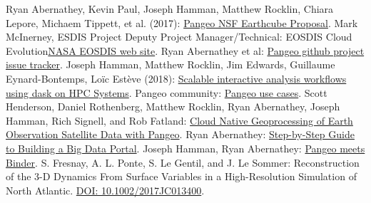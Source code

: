 \documentclass{article}
\begin{document}
\begin{thebibliography}{00}
 Ryan Abernathey, Kevin Paul, Joseph Hamman, Matthew Rocklin, Chiara Lepore, Michaem Tippett, et al. (2017): \href{https://figshare.com/articles/Pangeo_NSF_Earthcube_Proposal/5361094}{Pangeo NSF Earthcube Proposal}. 
 Mark McInerney, ESDIS Project Deputy Project Manager/Technical: EOSDIS Cloud Evolution\href{https://earthdata.nasa.gov/about/eosdis-cloud-evolution}{NASA EOSDIS web site}. 
 Ryan Abernathey et al: \href{https://github.com/pangeo-data/pangeo/issues}{Pangeo github project issue tracker}. 
 Joseph Hamman, Matthew Rocklin, Jim Edwards, Guillaume Eynard-Bontemps, Loïc Estève (2018): \href{https://medium.com/pangeo/dask-jobqueue-d7754e42ca53}{Scalable interactive analysis workflows using dask on HPC Systems}. 
 Pangeo community: \href{http://pangeo.io/use_cases/index.html}{Pangeo use cases}. 
 Scott Henderson, Daniel Rothenberg, Matthew Rocklin, Ryan Abernathey, Joseph Hamman, Rich Signell, and Rob Fatland: \href{https://medium.com/pangeo/cloud-native-geoprocessing-of-earth-observation-satellite-data-with-pangeo-997692d91ca2}{Cloud Native Geoprocessing of Earth Observation Satellite Data with Pangeo}. 
 Ryan Abernathey: \href{https://medium.com/pangeo/step-by-step-guide-to-building-a-big-data-portal-e262af1c2977}{Step-by-Step Guide to Building a Big Data Portal}.
 Joseph Hamman, Ryan Abernathey: \href{https://medium.com/pangeo/pangeo-meets-binder-2ea923feb34f}{Pangeo meets Binder}.
 S. Fresnay, A. L. Ponte, S. Le Gentil, and J. Le Sommer: Reconstruction of the 3-D Dynamics From Surface Variables in
a High-Resolution Simulation of North Atlantic. \href{https://agupubs.onlinelibrary.wiley.com/doi/abs/10.1002/2017JC013400}{DOI: 10.1002/2017JC013400}.
\end{thebibliography}
\end{document}
